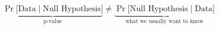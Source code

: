 \documentclass[preview, border={0pt 2pt 1pt 1pt}, varwidth=9cm]{standalone} %
\begin{document}









\(
    \underbrace{{\Pr}\big[\text{Data} \mid \text{Null Hypothesis}\big]}_{\text{p-value}} \neq \underbrace{{\Pr}\big[ \text{Null Hypothesis} \mid \text{Data} \big]}_{\text{what we usually want to know}}    
\)
\end{document}
